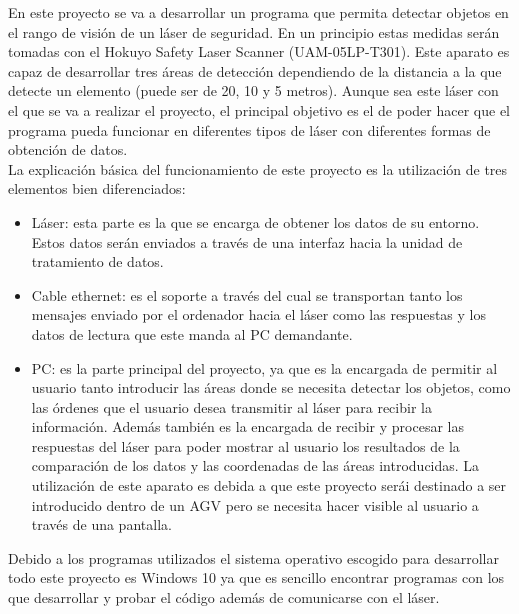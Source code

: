 
En este proyecto se va a desarrollar un programa que permita detectar objetos en el rango de visión de un láser de seguridad. En un principio estas medidas serán tomadas con el Hokuyo Safety Laser Scanner (UAM-05LP-T301). Este aparato es capaz de desarrollar tres áreas de detección dependiendo de la distancia a la que detecte un elemento (puede ser de 20, 10 y 5 metros). Aunque sea este láser con el que se va a realizar el proyecto, el principal objetivo es el de poder hacer que el programa pueda funcionar en diferentes tipos de láser con diferentes formas de obtención de datos.\\
La explicación básica del funcionamiento de este proyecto es la utilización de tres elementos bien diferenciados:
\begin{itemize}
    \item Láser: esta parte es la que se encarga de obtener los datos de su entorno. Estos datos serán enviados a través de una interfaz hacia la unidad de tratamiento de datos.
    \item Cable ethernet: es el soporte a través del cual se transportan tanto los mensajes enviado por el ordenador hacia el láser como las respuestas y los datos de lectura que este manda al PC demandante.
    \item PC: es la parte principal del proyecto, ya que es la encargada de permitir al usuario tanto introducir las áreas donde se necesita detectar los objetos, como las órdenes que el usuario desea transmitir al láser para recibir la información. Además también es la encargada de recibir y procesar las respuestas del láser para poder mostrar al usuario los resultados de la comparación de los datos y las coordenadas de las áreas introducidas. La utilización de este aparato es debida a que este proyecto serái destinado a ser introducido dentro de un AGV pero se necesita hacer visible al usuario a través de una pantalla.\\
\end{itemize}
Debido a los programas utilizados el sistema operativo escogido para desarrollar todo este proyecto es Windows 10 ya que es sencillo encontrar programas con los que desarrollar y probar el código además de comunicarse con el láser.\\
